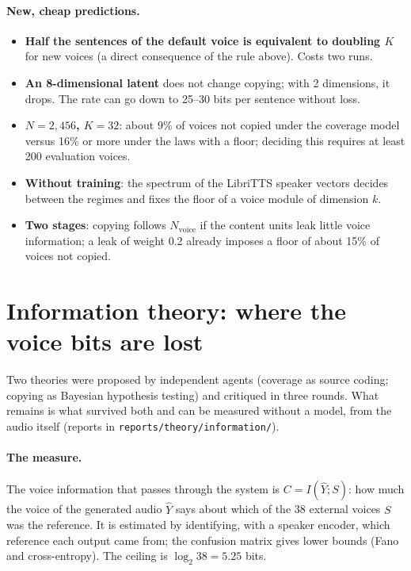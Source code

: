 \documentclass[a4paper,11pt]{article}
\begin{document}
\paragraph{New, cheap predictions.}
\begin{itemize}
\item \textbf{Half the sentences of the default voice is equivalent to doubling $K$} for new voices (a direct consequence of the rule above). Costs two runs.
\item \textbf{An 8-dimensional latent} does not change copying; with 2 dimensions, it drops. The rate can go down to 25--30 bits per sentence without loss.
\item \textbf{$N=2{,}456$, $K=32$}: about 9\% of voices not copied under the coverage model versus 16\% or more under the laws with a floor; deciding this requires at least 200 evaluation voices.
\item \textbf{Without training}: the spectrum of the LibriTTS speaker vectors decides between the regimes and fixes the floor of a voice module of dimension $k$.
\item \textbf{Two stages}: copying follows $N_{\text{voice}}$ if the content units leak little voice information; a leak of weight 0.2 already imposes a floor of about 15\% of voices not copied.
\end{itemize}

\section{Information theory: where the voice bits are lost}
\label{sec:info}

Two theories were proposed by independent agents (coverage as source coding; copying as Bayesian hypothesis testing) and critiqued in three rounds. What remains is what survived both and can be measured without a model, from the audio itself (reports in \texttt{reports/theory/information/}).

\paragraph{The measure.} The voice information that passes through the system is $C = I(\hat Y; S)$: how much the voice of the generated audio $\hat Y$ says about which of the 38 external voices $S$ was the reference. It is estimated by identifying, with a speaker encoder, which reference each output came from; the confusion matrix gives lower bounds (Fano and cross-entropy). The ceiling is $\log_2 38 = 5.25$ bits.
\end{document}
